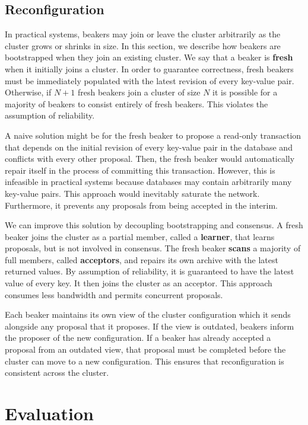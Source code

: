 \documentclass[../main.tex]{subfiles}
\begin{document}
  \subsection{Reconfiguration}
  In practical systems, beakers may join or leave the cluster arbitrarily as the cluster grows or
  shrinks in size. In this section, we describe how beakers are bootstrapped when they join an
  existing cluster. We say that a beaker is \textbf{fresh} when it initially joins a cluster. In
  order to guarantee correctness, fresh beakers must be immediately populated with the latest
  revision of every key-value pair. Otherwise, if $N + 1$ fresh beakers join a cluster of size $N$
  it is possible for a majority of beakers to consist entirely of fresh beakers. This violates the
  assumption of reliability.

  A naive solution might be for the fresh beaker to propose a read-only transaction that depends on
  the initial revision of every key-value pair in the database and conflicts with every other
  proposal. Then, the fresh beaker would automatically repair itself in the process of committing
  this transaction. However, this is infeasible in practical systems because databases may contain
  arbitrarily many key-value pairs. This approach would inevitably saturate the network.
  Furthermore, it prevents any proposals from being accepted in the interim.

  We can improve this solution by decoupling bootstrapping and consensus. A fresh beaker joins the
  cluster as a partial member, called a \textbf{learner}, that learns proposals, but is not involved
  in consensus. The fresh beaker \textbf{scans} a majority of full members, called
  \textbf{acceptors}, and repairs its own archive with the latest returned values. By assumption of
  reliability, it is guaranteed to have the latest value of every key. It then joins the cluster as
  an acceptor. This approach consumes less bandwidth and permits concurrent proposals.

  Each beaker maintains its own view of the cluster configuration which it sends alongside any
  proposal that it proposes. If the view is outdated, beakers inform the proposer of the new
  configuration. If a beaker has already accepted a proposal from an outdated view, that proposal
  must be completed before the cluster can move to a new configuration. This ensures that
  reconfiguration is consistent across the cluster.

\section{Evaluation}
\end{document}
